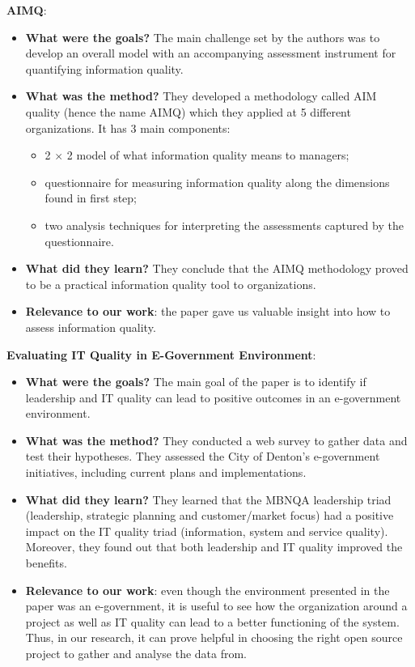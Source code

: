 \documentclass{mprop}
\begin{document}
 \textbf{AIMQ}\cite{lee2002aimq}:
 \begin{itemize}
   \item \textbf{What were the goals?}
     The main challenge set by the authors was to develop an overall model
     with an accompanying assessment instrument for quantifying information
     quality.
   \item \textbf{What was the method?}
     They developed a methodology called AIM quality (hence the name AIMQ) which
     they applied at 5 different organizations. It has 3 main components:
      \begin{itemize}
        \item 2 $\times$ 2 model of what information quality means to managers;
        \item questionnaire for measuring information quality along the dimensions
          found in first step;
        \item two analysis techniques for interpreting the assessments captured 
          by the questionnaire.
      \end{itemize} 
   \item \textbf{What did they learn?}
      They conclude that the AIMQ methodology proved to be a practical information
      quality tool to organizations.
   \item \textbf{Relevance to our work}: the paper gave us valuable insight into 
     how to assess information quality.
\end{itemize}

\textbf{Evaluating IT Quality in E-Government 
        Environment}\cite{prybutok2008evaluating}:
\begin{itemize}
  \item \textbf{What were the goals?}
    The main goal of the paper is to identify if leadership and IT quality
    can lead to positive outcomes in an e-government environment.
  \item \textbf{What was the method?}
    They conducted a web survey to gather data and test their hypotheses. They
    assessed the City of Denton's e-government initiatives, including current 
    plans and implementations.
  \item \textbf{What did they learn?}
    They learned that the MBNQA leadership triad (leadership, strategic
    planning and customer/market focus) had a positive impact on the IT quality
    triad (information, system and service quality). Moreover, they found out
    that both leadership and IT quality improved the benefits.
  \item \textbf{Relevance to our work}: even though the environment presented
    in the paper was an e-government, it is useful to see how the organization 
    around a project as well as IT quality can lead to a better functioning of the 
    system. Thus, in our research, it can prove helpful in choosing the right 
    open source project to gather and analyse the data from.
\end{itemize}
\end{document}
